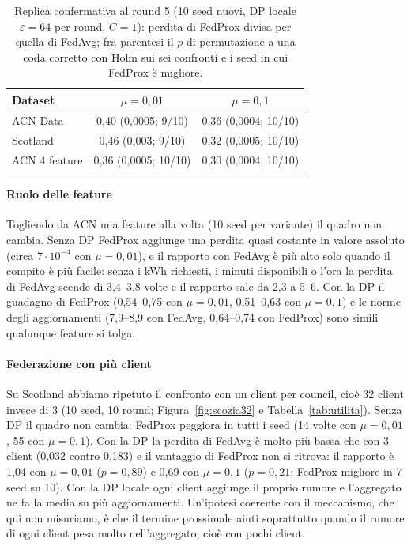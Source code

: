 \begin{table}[t]
\caption{Replica confermativa al round 5 (10 seed nuovi, DP locale $\varepsilon=64$ per round,
$C=1$): perdita di FedProx divisa per quella di FedAvg; fra parentesi il $p$ di permutazione a
una coda corretto con Holm sui sei confronti e i seed in cui FedProx è migliore.}
\label{tab:replica5}
\centering\footnotesize
\setlength{\tabcolsep}{4pt}
\begin{tabular}{@{}lcc@{}}
\toprule
Dataset & $\mu=0{,}01$ & $\mu=0{,}1$ \\
\midrule
ACN-Data      & 0,40 (0,0005; 9/10)  & 0,36 (0,0004; 10/10) \\
Scotland      & 0,46 (0,003; 9/10)   & 0,32 (0,0005; 10/10) \\
ACN 4 feature & 0,36 (0,0005; 10/10) & 0,30 (0,0004; 10/10) \\
\bottomrule
\end{tabular}
\end{table}

\paragraph{Ruolo delle feature}
Togliendo da ACN una feature alla volta (10 seed per variante) il quadro non cambia. Senza DP
FedProx aggiunge una perdita quasi costante in valore assoluto (circa $7\cdot10^{-4}$ con
$\mu=0{,}01$), e il rapporto con FedAvg è più alto solo quando il compito è più facile: senza
i kWh richiesti, i minuti disponibili o l'ora la perdita di FedAvg scende di 3,4--3,8 volte e il
rapporto sale da 2,3 a 5--6. Con la DP il guadagno di FedProx (0,54--0,75 con $\mu=0{,}01$,
0,51--0,63 con $\mu=0{,}1$) e le norme degli aggiornamenti (7,9--8,9 con FedAvg, 0,64--0,74 con
FedProx) sono simili qualunque feature si tolga.

\paragraph{Federazione con più client}
Su Scotland abbiamo ripetuto il confronto con un client per council, cioè 32 client invece di 3
(10 seed, 10 round; Figura~\ref{fig:scozia32} e Tabella~\ref{tab:utilita}). Senza DP il quadro non
cambia: FedProx peggiora in tutti i seed (14 volte con $\mu=0{,}01$, 55 con $\mu=0{,}1$). Con la DP
la perdita di FedAvg è molto più bassa che con 3 client (0,032 contro 0,183) e il vantaggio di
FedProx non si ritrova: il rapporto è 1,04 con $\mu=0{,}01$ ($p=0{,}89$) e 0,69 con $\mu=0{,}1$
($p=0{,}21$; FedProx migliore in 7 seed su 10). Con la DP locale ogni client aggiunge il proprio
rumore e l'aggregato ne fa la media su più aggiornamenti. Un'ipotesi coerente con il meccanismo,
che qui non misuriamo, è che il termine prossimale aiuti soprattutto quando il rumore di ogni
client pesa molto nell'aggregato, cioè con pochi client.

